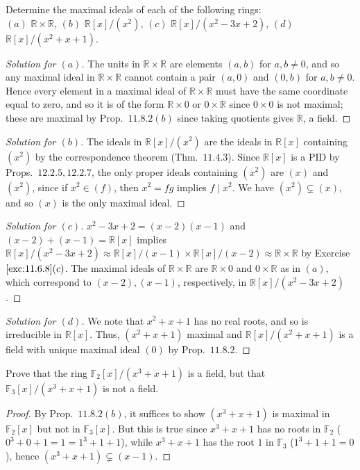 \documentclass[12pt]{article}
\theoremstyle{remark}
\begin{document}
\begin{problem}
  Determine the maximal ideals of each of the following rings:\\
  $(a)$ $\mathbb{R} \times \mathbb{R}$, $(b)$ $\mathbb{R}[x]/(x^2)$, $(c)$ $\mathbb{R}[x]/(x^2-3x+2)$, $(d)$ $\mathbb{R}[x]/(x^2+x+1)$.
\end{problem}
\begin{proof}[Solution for $(a)$]
  The units in $\mathbb{R} \times \mathbb{R}$ are elements $(a,b)$ for $a,b \ne 0$, and so any maximal ideal in $\mathbb{R} \times \mathbb{R}$ cannot contain a pair $(a,0)$ and $(0,b)$ for $a,b \ne 0$. Hence every element in a maximal ideal of $\mathbb{R} \times \mathbb{R}$ must have the same coordinate equal to zero, and so it is of the form $\mathbb{R} \times 0$ or $0 \times \mathbb{R}$ since $0 \times 0$ is not maximal; these are maximal by Prop.~$11.8.2(b)$ since taking quotients gives $\mathbb{R}$, a field.
\end{proof}
\begin{proof}[Solution for $(b)$]
  The ideals in $\mathbb{R}[x]/(x^2)$ are the ideals in $\mathbb{R}[x]$ containing $(x^2)$ by the correspondence theorem (Thm.~$11.4.3$). Since $\mathbb{R}[x]$ is a PID by Props.~$12.2.5,12.2.7$, the only proper ideals containing $(x^2)$ are $(x)$ and $(x^2)$, since if $x^2 \in (f)$, then $x^2 = fg$ implies $f \mid x^2$. We have $(x^2) \subsetneq (x)$, and so $(x)$ is the only maximal ideal.
\end{proof}
\begin{proof}[Solution for $(c)$]
  $x^2-3x+2 = (x-2)(x-1)$ and $(x-2) + (x-1) = \mathbb{R}[x]$ implies $\mathbb{R}[x]/(x^2-3x+2) \approx \mathbb{R}[x]/(x-1) \times \mathbb{R}[x]/(x-2) \approx \mathbb{R} \times \mathbb{R}$ by Exercise $\ref{exc:11.6.8}(c)$. The maximal ideals of $\mathbb{R} \times \mathbb{R}$ are $\mathbb{R} \times 0$ and $0 \times \mathbb{R}$ as in $(a)$, which correspond to $(x-2),(x-1)$, respectively, in $\mathbb{R}[x]/(x^2-3x+2)$.
\end{proof}
\begin{proof}[Solution for $(d)$]
  We note that $x^2+x+1$ has no real roots, and so is irreducible in $\mathbb{R}[x]$. Thus, $(x^2+x+1)$ maximal and $\mathbb{R}[x]/(x^2+x+1)$ is a field with unique maximal ideal $(0)$ by Prop.~$11.8.2$.
\end{proof}

\begin{problem}
  Prove that the ring $\mathbb{F}_2[x]/(x^3+x+1)$ is a field, but that $\mathbb{F}_3[x]/(x^3+x+1)$ is not a field.
\end{problem}
\begin{proof}
  By Prop.~$11.8.2(b)$, it suffices to show $(x^3+x+1)$ is maximal in $\mathbb{F}_2[x]$ but not in $\mathbb{F}_3[x]$. But this is true since $x^3+x+1$ has no roots in $\mathbb{F}_2$ ($0^3+0+1 = 1 = 1^3 + 1 + 1$), while $x^3+x+1$ has the root $1$ in $\mathbb{F}_3$ ($1^3+1+1 = 0$), hence $(x^3+x+1) \subsetneq (x-1)$.
\end{proof}
\end{document}

